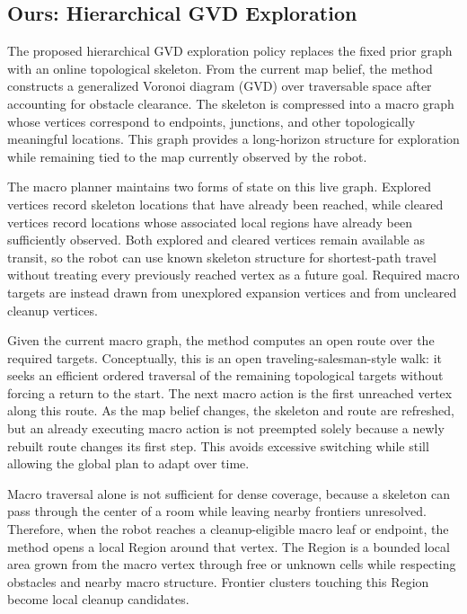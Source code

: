 \documentclass[conference]{IEEEtran}
\begin{document}
\subsection{Ours: Hierarchical GVD Exploration}

The proposed hierarchical GVD exploration policy replaces the fixed prior graph with an online topological skeleton. From the current map belief, the method constructs a generalized Voronoi diagram (GVD) over traversable space after accounting for obstacle clearance. The skeleton is compressed into a macro graph whose vertices correspond to endpoints, junctions, and other topologically meaningful locations. This graph provides a long-horizon structure for exploration while remaining tied to the map currently observed by the robot.

The macro planner maintains two forms of state on this live graph. Explored vertices record skeleton locations that have already been reached, while cleared vertices record locations whose associated local regions have already been sufficiently observed. Both explored and cleared vertices remain available as transit, so the robot can use known skeleton structure for shortest-path travel without treating every previously reached vertex as a future goal. Required macro targets are instead drawn from unexplored expansion vertices and from uncleared cleanup vertices.

Given the current macro graph, the method computes an open route over the required targets. Conceptually, this is an open traveling-salesman-style walk: it seeks an efficient ordered traversal of the remaining topological targets without forcing a return to the start. The next macro action is the first unreached vertex along this route. As the map belief changes, the skeleton and route are refreshed, but an already executing macro action is not preempted solely because a newly rebuilt route changes its first step. This avoids excessive switching while still allowing the global plan to adapt over time.

Macro traversal alone is not sufficient for dense coverage, because a skeleton can pass through the center of a room while leaving nearby frontiers unresolved. Therefore, when the robot reaches a cleanup-eligible macro leaf or endpoint, the method opens a local Region around that vertex. The Region is a bounded local area grown from the macro vertex through free or unknown cells while respecting obstacles and nearby macro structure. Frontier clusters touching this Region become local cleanup candidates.
\end{document}
